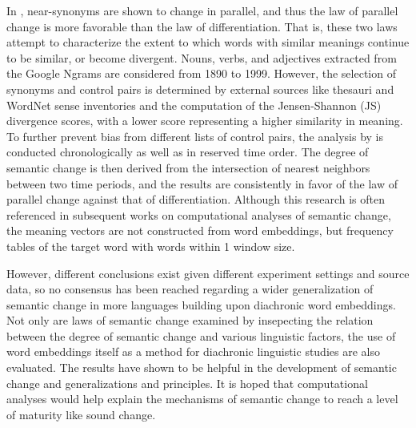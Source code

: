 In \textcite{xu2015computational}, near-synonyms are shown to change in parallel, and thus the law of parallel change is more favorable than the law of differentiation. That is, these two laws attempt to characterize the extent to which words with similar meanings continue to be similar, or become divergent. Nouns, verbs, and adjectives extracted from the Google Ngrams are considered from 1890 to 1999. However, the selection of synonyms and control pairs is determined by external sources like thesauri and WordNet sense inventories and the computation of the Jensen-Shannon (JS) divergence scores, with a lower score representing a higher similarity in meaning. To further prevent bias from different lists of control pairs, the analysis by \textcite{xu2015computational} is conducted chronologically as well as in reserved time order. The degree of semantic change is then derived from the intersection of nearest neighbors between two time periods, and the results are consistently in favor of the law of parallel change against that of differentiation. Although this research is often referenced in subsequent works on computational analyses of semantic change, the meaning vectors are not constructed from word embeddings, but frequency tables of the target word with words within 1 window size.

However, different conclusions exist given different experiment settings and source data, so no consensus has been reached regarding a wider generalization of semantic change in more languages building upon diachronic word embeddings. Not only are laws of semantic change examined by insepecting the relation between the degree of semantic change and various linguistic factors, the use of word embeddings itself as a method for diachronic linguistic studies are also evaluated. The results have shown to be helpful in the development of semantic change and generalizations and principles. It is hoped that computational analyses would help explain the mechanisms of semantic change to reach a level of maturity like sound change. %

